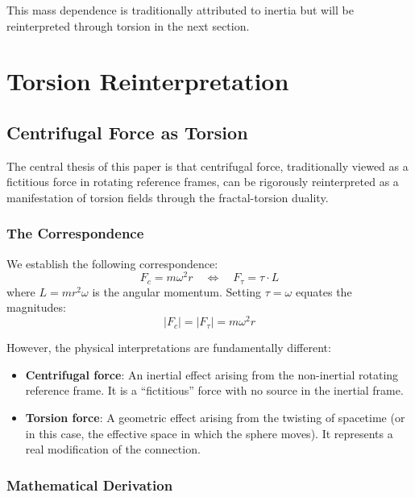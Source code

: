 \documentclass[12pt,a4paper]{article}
\begin{document}
This mass dependence is traditionally attributed to inertia but will be reinterpreted through torsion in the next section.

\section{Torsion Reinterpretation}
\label{sec:dual}

\subsection{Centrifugal Force as Torsion}

The central thesis of this paper is that centrifugal force, traditionally viewed as a fictitious force in rotating reference frames, can be rigorously reinterpreted as a manifestation of torsion fields through the fractal-torsion duality.

\subsubsection{The Correspondence}

We establish the following correspondence:
\begin{equation}
    F_c = m\omega^2 r \quad \Longleftrightarrow \quad F_\tau = \tau \cdot L
\end{equation}
where $L = mr^2\omega$ is the angular momentum. Setting $\tau = \omega$ equates the magnitudes:
\begin{equation}
    |F_c| = |F_\tau| = m\omega^2 r
\end{equation}

However, the physical interpretations are fundamentally different:
\begin{itemize}
    \item \textbf{Centrifugal force}: An inertial effect arising from the non-inertial rotating reference frame. It is a ``fictitious'' force with no source in the inertial frame.
    \item \textbf{Torsion force}: A geometric effect arising from the twisting of spacetime (or in this case, the effective space in which the sphere moves). It represents a real modification of the connection.
\end{itemize}

\subsubsection{Mathematical Derivation}
\end{document}
